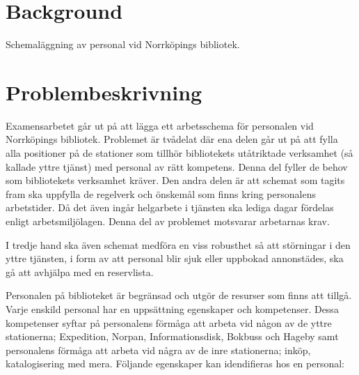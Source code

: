 

\section{Background} 
Schemaläggning av personal vid Norrköpings bibliotek.

\section{Problembeskrivning}
Examensarbetet går ut på att lägga ett arbetsschema för personalen vid Norrköpings bibliotek. Problemet är tvådelat där ena delen går ut på att fylla alla positioner på de stationer som tillhör bibliotekets utåtriktade verksamhet (så kallade yttre tjänst) med personal av rätt kompetens. Denna del fyller de behov som bibliotekets verksamhet kräver. Den andra delen är att schemat som tagits fram ska uppfylla de regelverk och önskemål som finns kring personalens arbetstider. Då det även ingår helgarbete i tjänsten ska lediga dagar fördelas enligt arbetsmiljölagen. Denna del av problemet motsvarar arbetarnas krav.

I tredje hand ska även schemat medföra en viss robusthet så att störningar i den yttre tjänsten, i form av att personal blir sjuk eller uppbokad annonstädes, ska gå att avhjälpa med en reservlista. 

Personalen på biblioteket är begränsad och utgör de resurser som finns att tillgå. Varje enskild personal har en uppsättning egenskaper och kompetenser. Dessa kompetenser syftar på personalens förmåga att arbeta vid någon av de yttre stationerna; Expedition, Norpan, Informationsdisk, Bokbuss och Hageby samt personalens förmåga att arbeta vid några av de inre stationerna; inköp, katalogisering med mera. Följande egenskaper kan idendifieras hos en personal: \\

